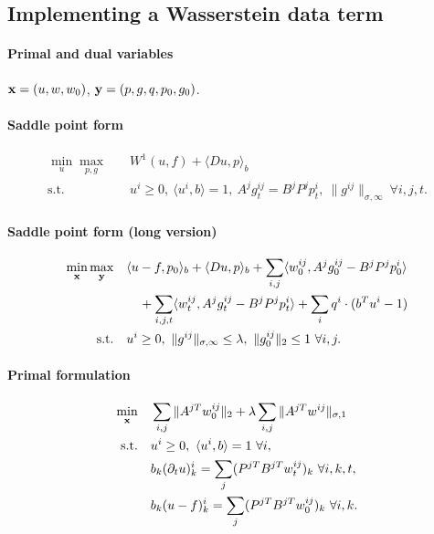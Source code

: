 
\subsection{Implementing a Wasserstein data term}

\paragraph{Primal and dual variables}
$\mathbf{x} = (u,w,w_0)$, $\mathbf{y} = (p,g,q,p_0,g_0)$.

\paragraph{Saddle point form}
\begin{align*}
    \min_{u} \max_{p,g} \quad
        & W^1(u,f) + \langle Du, p \rangle_b \\
    \text{s.t.}\quad
        & u^i \geq 0, ~\langle u^i, b \rangle = 1,
          ~A^j g^{ij}_t = B^j P^j p^i_t,
          ~\|g^{ij}\|_{\sigma,\infty} ~\forall i,j,t.
\end{align*}

\paragraph{Saddle point form (long version)}
\begin{align*}
    \min_{\mathbf{x}} \max_{\mathbf{y}} \quad
        & \langle u-f, p_0 \rangle_b
            + \langle Du, p \rangle_b
            + \sum_{i,j} \langle w_0^{ij}, A^j g_0^{ij} - B^j P^j p_0^i \rangle
            \\
        &\quad + \sum_{i,j,t} \langle w^{ij}_t, A^j g^{ij}_t - B^j P^j p^i_t \rangle
            + \sum_{i} q^i \cdot (b^T u^i - 1) \\
    \text{s.t.}\quad
        & u^i \geq 0,
            ~\|g^{ij}\|_{\sigma,\infty} \leq \lambda,
            ~\|g_0^{ij}\|_{2} \leq 1 ~\forall i,j.
\end{align*}

\paragraph{Primal formulation}
\begin{align*}
    \min_{\mathbf{x}} \quad
        & \sum_{i,j} \| A^{jT} w_0^{ij} \|_{2}
            + \lambda \sum_{i,j} \| A^{jT} w^{ij} \|_{\sigma,1} \\
    \text{s.t.}\quad
        & u^i \geq 0, ~\langle u^i, b \rangle = 1 ~\forall i, \\
        & b_k (\partial_t u)_k^i = \sum_j (P^{jT}B^{jT}w^{ij}_t)_{k} ~\forall i,k,t, \\
        & b_k (u - f)_k^i = \sum_j (P^{jT}B^{jT}w_0^{ij})_{k} ~\forall i,k.
\end{align*}

